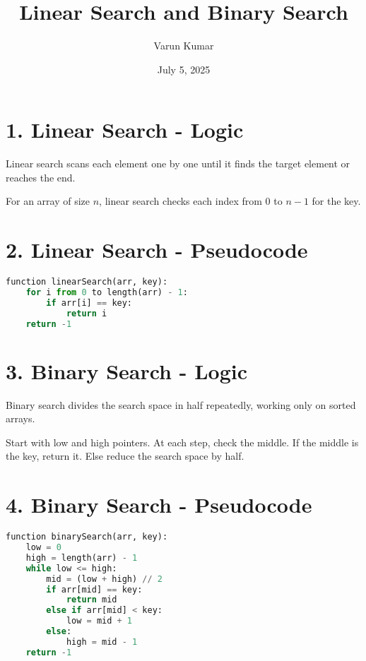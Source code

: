 \documentclass[14pt]{extarticle}
\title{\textbf{Linear Search and Binary Search}}
\author{Varun Kumar}
\date{July 5, 2025}
\begin{document}
\maketitle

\section*{1. Linear Search - Logic}
Linear search scans each element one by one until it finds the target element or reaches the end.

\begin{tcolorbox}[colback=white, colframe=black, title=Key Idea]
For an array of size $n$, linear search checks each index from $0$ to $n-1$ for the key.
\end{tcolorbox}

\section*{2. Linear Search - Pseudocode}

\begin{lstlisting}[language=Python]
function linearSearch(arr, key):
    for i from 0 to length(arr) - 1:
        if arr[i] == key:
            return i
    return -1
\end{lstlisting}

\section*{3. Binary Search - Logic}
Binary search divides the search space in half repeatedly, working only on sorted arrays.

\begin{tcolorbox}[colback=white, colframe=black, title=Key Idea]
Start with low and high pointers. At each step, check the middle. If the middle is the key, return it. Else reduce the search space by half.
\end{tcolorbox}

\section*{4. Binary Search - Pseudocode}

\begin{lstlisting}[language=Python]
function binarySearch(arr, key):
    low = 0
    high = length(arr) - 1
    while low <= high:
        mid = (low + high) // 2
        if arr[mid] == key:
            return mid
        else if arr[mid] < key:
            low = mid + 1
        else:
            high = mid - 1
    return -1
\end{lstlisting}
\end{document}
